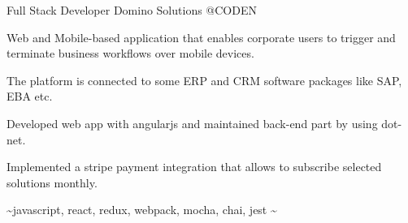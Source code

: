 \begin{cventries}
  \cventry
    {Full Stack Developer} %
    {Domino Solutions} %
    {@CODEN} %
    {}
    {
      \begin{cvitems} %
        \item {Web and Mobile-based application that enables corporate users to trigger and terminate business workflows over mobile devices.}
        \item {The platform is connected to some ERP and CRM software packages like SAP, EBA etc.}
        \item {Developed web app with angularjs and maintained back-end part by using dot-net.}
        \item {Implemented a stripe payment integration that allows to subscribe selected solutions monthly.}
        \item {\textasciitilde javascript, react, redux, webpack, mocha, chai, jest \textasciitilde}
      \end{cvitems}
    }
\end{cventries}
